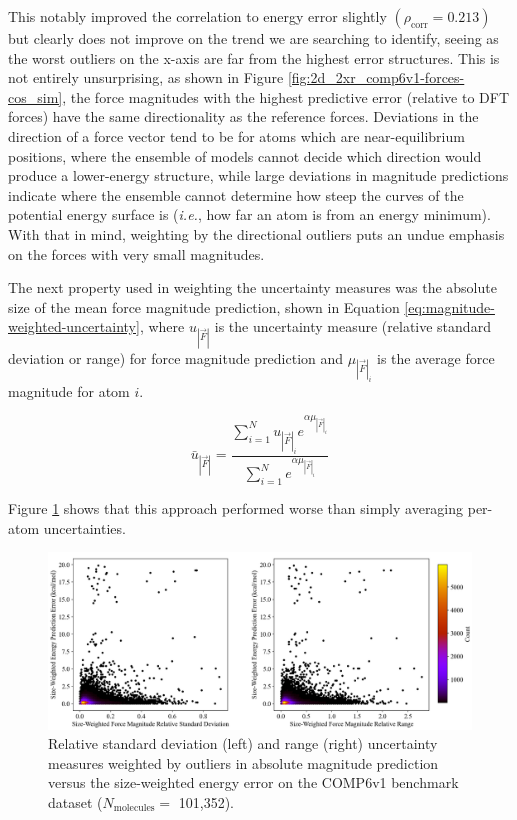 This notably improved the correlation to energy error slightly $(\rho_{\text{corr}}=0.213)$ but clearly does not improve on the trend we are searching to identify, seeing as the worst outliers on the x-axis are far from the highest error structures.
This is not entirely unsurprising, as shown in Figure \ref{fig:2d_2xr_comp6v1-forces-cos_sim}, the force magnitudes with the highest predictive error (relative to DFT forces) have the same directionality as the reference forces.
Deviations in the direction of a force vector tend to be for atoms which are near-equilibrium positions, where the ensemble of models cannot decide which direction would produce a lower-energy structure, while large deviations in magnitude predictions indicate where the ensemble cannot determine how steep the curves of the potential energy surface is (\textit{i.e.}, how far an atom is from an energy minimum).
With that in mind, weighting by the directional outliers puts an undue emphasis on the forces with very small magnitudes.

The next property used in weighting the uncertainty measures was the absolute size of the mean force magnitude prediction, shown in Equation \ref{eq:magnitude-weighted-uncertainty}, where $u_{|\vec{F}|}$ is the uncertainty measure (relative standard deviation or range) for force magnitude prediction and $\mu_{|\vec{F}|_i}$ is the average force magnitude for atom $i$.

\begin{equation}
    \bar{u}_{|\vec{F}|} = \frac{\sum_{i=1}^{N} u_{|\vec{F}|_i} e^{\alpha \mu_{|\vec{F}|_i}}}{\sum_{i=1}^{N} e^{\alpha \mu_{|\vec{F}|_i}}}
    \label{eq:magnitude-weighted-uncertainty}
\end{equation}

Figure \ref{fig:2xr_comp6v1-forces-weighed_uncertainty} shows that this approach performed worse than simply averaging per-atom uncertainties. 

\begin{figure}[H]
    \centering
    \includegraphics[width=1\linewidth]{Images/2xr_forces/weighted_uncertainty-vs-size_weighted_error.png}
    \caption[Force uncertainty exponentially weighted by outliers versus energy error (COMP6v1)]{Relative standard deviation (left) and range (right) uncertainty measures weighted by outliers in absolute magnitude prediction versus the size-weighted energy error on the COMP6v1 benchmark dataset ($N_\text{molecules}=$ 101,352).}
    \label{fig:2xr_comp6v1-forces-weighed_uncertainty}
\end{figure}

